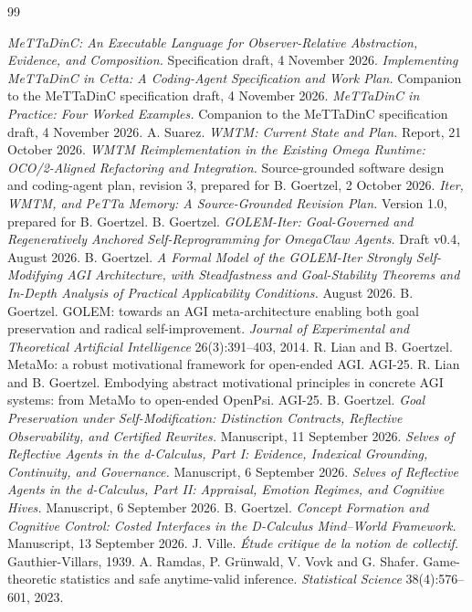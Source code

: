 \documentclass[11pt]{article}
\theoremstyle{definition}
\theoremstyle{plain}
\begin{document}
\begin{thebibliography}{99}\small
{}
 \emph{MeTTaDinC: An Executable Language for Observer-Relative Abstraction, Evidence,
and Composition.} Specification draft, 4 November 2026.
 \emph{Implementing MeTTaDinC in Cetta: A Coding-Agent Specification and Work
Plan.} Companion to the MeTTaDinC specification draft, 4 November 2026.
 \emph{MeTTaDinC in Practice: Four Worked Examples.} Companion to the MeTTaDinC
specification draft, 4 November 2026.
 A. Suarez. \emph{WMTM: Current State and Plan.} Report, 21 October 2026.
 \emph{WMTM Reimplementation in the Existing Omega Runtime: OCO/2-Aligned Refactoring
and Integration.} Source-grounded software design and coding-agent plan, revision 3, prepared for
B. Goertzel, 2 October 2026.
 \emph{Iter, WMTM, and PeTTa Memory: A Source-Grounded Revision Plan.} Version 1.0,
prepared for B. Goertzel.
 B. Goertzel. \emph{GOLEM-Iter: Goal-Governed and Regeneratively Anchored
Self-Reprogramming for OmegaClaw Agents.} Draft v0.4, August 2026.
 B. Goertzel. \emph{A Formal Model of the GOLEM-Iter Strongly Self-Modifying AGI
Architecture, with Steadfastness and Goal-Stability Theorems and In-Depth Analysis of Practical
Applicability Conditions.} August 2026.
 B. Goertzel. GOLEM: towards an AGI meta-architecture enabling both goal preservation
and radical self-improvement. \emph{Journal of Experimental and Theoretical Artificial Intelligence}
26(3):391--403, 2014.
 R. Lian and B. Goertzel. MetaMo: a robust motivational framework for open-ended
AGI. AGI-25.
 R. Lian and B. Goertzel. Embodying abstract motivational principles in concrete
AGI systems: from MetaMo to open-ended OpenPsi. AGI-25.
 B. Goertzel. \emph{Goal Preservation under Self-Modification: Distinction
Contracts, Reflective Observability, and Certified Rewrites.} Manuscript, 11 September 2026.
 \emph{Selves of Reflective Agents in the d-Calculus, Part I: Evidence, Indexical
Grounding, Continuity, and Governance.} Manuscript, 6 September 2026.
 \emph{Selves of Reflective Agents in the d-Calculus, Part II: Appraisal, Emotion
Regimes, and Cognitive Hives.} Manuscript, 6 September 2026.
 B. Goertzel. \emph{Concept Formation and Cognitive Control: Costed Interfaces in
the D-Calculus Mind--World Framework.} Manuscript, 13 September 2026.
 J. Ville. \emph{\'Etude critique de la notion de collectif.} Gauthier-Villars, 1939.
 A. Ramdas, P. Gr\"unwald, V. Vovk and G. Shafer. Game-theoretic statistics and
safe anytime-valid inference. \emph{Statistical Science} 38(4):576--601, 2023.
\end{thebibliography}
\clearpage
\appendix
\end{document}
